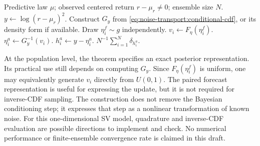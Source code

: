 \begin{algorithm}[htbp]
\caption{One-step noise-transport update}
\begin{algorithmic}[1]
\Require Predictive law $\mu$; observed centered return $r-\mu_r\ne0$;
ensemble size $N$.
\State $y\gets\log(r-\mu_r)^2$.
\State Construct $G_y$ from \eqref{eq:noise-transport:conditional-cdf}, or its
density form if available.
    \State Draw $\eta_i^f\sim g$ independently.
    \State $v_i\gets F_\eta(\eta_i^f)$.
    \State $\eta_i^a\gets G_y^{-1}(v_i)$.
    \State $h_i^a\gets y-\eta_i^a$.
\EndFor
\State \Return $N^{-1}\sum_{i=1}^N\delta_{h_i^a}$.
\end{algorithmic}
\end{algorithm}

At the population level, the theorem specifies an exact posterior
representation. Its practical use still depends on computing $G_y$.
Since $F_\eta(\eta_i^f)$ is uniform, one may equivalently generate
$v_i$ directly from $U(0,1)$. The paired forecast representation is useful
for expressing the update, but it is not required for inverse-CDF sampling.
The construction does not remove the Bayesian conditioning step; it
expresses that step as a nonlinear transformation of known noise.
For this one-dimensional SV model, quadrature and inverse-CDF evaluation
are possible directions to implement and check. No numerical performance
or finite-ensemble convergence rate is claimed in this draft.
